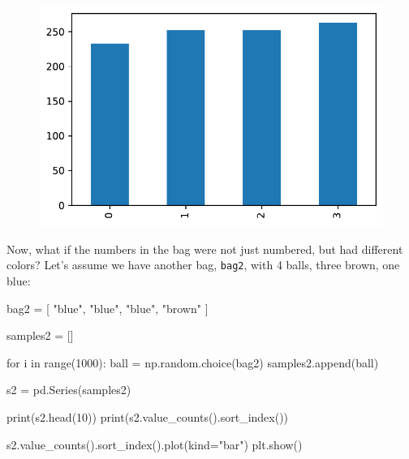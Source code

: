 \documentclass[
  a4paperpaper,
  ,captions=tableheading
]{scrbook}
\newenvironment{Shaded}{\begin{snugshade}}{\end{snugshade}}
\newcommand{\BuiltInTok}[1]{\textcolor[rgb]{0.00,0.23,0.31}{#1}}
\newcommand{\ControlFlowTok}[1]{\textcolor[rgb]{0.00,0.23,0.31}{#1}}
\newcommand{\DecValTok}[1]{\textcolor[rgb]{0.68,0.00,0.00}{#1}}
\newcommand{\KeywordTok}[1]{\textcolor[rgb]{0.00,0.23,0.31}{#1}}
\newcommand{\NormalTok}[1]{\textcolor[rgb]{0.00,0.23,0.31}{#1}}
\newcommand{\OperatorTok}[1]{\textcolor[rgb]{0.37,0.37,0.37}{#1}}
\newcommand{\StringTok}[1]{\textcolor[rgb]{0.13,0.47,0.30}{#1}}
\begin{document}
\begin{figure}[H]

{\centering \includegraphics{randomness_files/figure-pdf/cell-4-output-1.pdf}

}

\end{figure}

Now, what if the numbers in the bag were not just numbered, but had
different colors? Let's assume we have another bag, \texttt{bag2}, with
4 balls, three brown, one blue:

\begin{Shaded}
\begin{Highlighting}[]
\NormalTok{bag2 }\OperatorTok{=}\NormalTok{ [ }\StringTok{"blue"}\NormalTok{, }\StringTok{"blue"}\NormalTok{, }\StringTok{"blue"}\NormalTok{, }\StringTok{"brown"}\NormalTok{ ]}

\NormalTok{samples2 }\OperatorTok{=}\NormalTok{ []}

\ControlFlowTok{for}\NormalTok{ i }\KeywordTok{in} \BuiltInTok{range}\NormalTok{(}\DecValTok{1000}\NormalTok{):}
\NormalTok{    ball }\OperatorTok{=}\NormalTok{ np.random.choice(bag2)}
\NormalTok{    samples2.append(ball)}

\NormalTok{s2 }\OperatorTok{=}\NormalTok{ pd.Series(samples2)}

\BuiltInTok{print}\NormalTok{(s2.head(}\DecValTok{10}\NormalTok{))}
\BuiltInTok{print}\NormalTok{(s2.value\_counts().sort\_index())}

\NormalTok{s2.value\_counts().sort\_index().plot(kind}\OperatorTok{=}\StringTok{"bar"}\NormalTok{)}
\NormalTok{plt.show()}
\end{Highlighting}
\end{Shaded}
\end{document}
